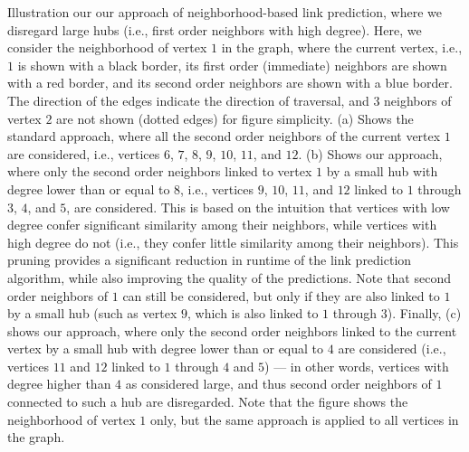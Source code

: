 Illustration our our approach of neighborhood-based link prediction, where we disregard large hubs (i.e., first order neighbors with high degree). Here, we consider the neighborhood of vertex $1$ in the graph, where the current vertex, i.e., $1$ is shown with a black border, its first order (immediate) neighbors are shown with a red border, and its second order neighbors are shown with a blue border. The direction of the edges indicate the direction of traversal, and $3$ neighbors of vertex $2$ are not shown (dotted edges) for figure simplicity. (a) Shows the standard approach, where all the second order neighbors of the current vertex $1$ are considered, i.e., vertices $6$, $7$, $8$, $9$, $10$, $11$, and $12$. (b) Shows our approach, where only the second order neighbors linked to vertex $1$ by a small hub with degree lower than or equal to $8$, i.e., vertices $9$, $10$, $11$, and $12$ linked to $1$ through $3$, $4$, and $5$, are considered. This is based on the intuition that vertices with low degree confer significant similarity among their neighbors, while vertices with high degree do not (i.e., they confer little similarity among their neighbors). This pruning provides a significant reduction in runtime of the link prediction algorithm, while also improving the quality of the predictions. Note that second order neighbors of $1$ can still be considered, but only if they are also linked to $1$ by a small hub (such as vertex $9$, which is also linked to $1$ through $3$). Finally, (c) shows our approach, where only the second order neighbors linked to the current vertex by a small hub with degree lower than or equal to $4$ are considered (i.e., vertices $11$ and $12$ linked to $1$ through $4$ and $5$) --- in other words, vertices with degree higher than $4$ as considered large, and thus second order neighbors of $1$ connected to such a hub are disregarded. Note that the figure shows the neighborhood of vertex $1$ only, but the same approach is applied to all vertices in the graph.



